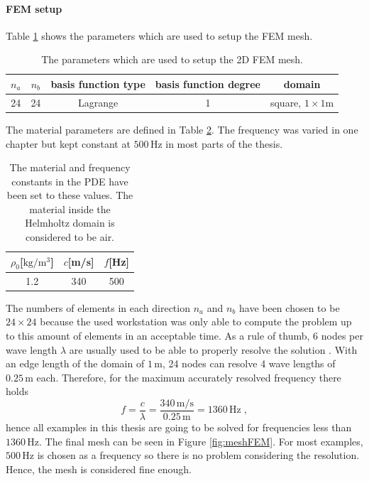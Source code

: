 \documentclass[%
  a4paper,oneside,%
  11pt,%
  smallchapters,
  style=printdev,
  extramargin,
  green,%
  rgb, <cmyk>
  ]{tubsbook}
\begin{document}
\paragraph{FEM setup}
Table \ref{tab:FEMSetup} shows the parameters which are used to setup the FEM mesh.  
\begin{table}[]
\centering
\caption{The parameters which are used to setup the 2D FEM mesh.}
\label{tab:FEMSetup}
\begin{tabular}{@{}ccccc@{}}
\toprule
$n_a$ & $n_b$ & basis function type & basis function degree & domain               \\ \midrule
24    & 24    & Lagrange            & 1                     & square, $1\times 1$m \\ \bottomrule
\end{tabular}
\end{table}
The material parameters are defined in Table \ref{tab:MatSetup}. The frequency was varied in one chapter but kept constant at $500\,\mathrm{Hz}$ in most parts of the thesis.
\begin{table}[]
\centering
\caption{The material and frequency constants in the PDE have been set to these values. The material inside the Helmholtz domain is considered to be air.}
\label{tab:MatSetup}
\begin{tabular}{@{}ccc@{}}
\toprule
$\rho_0${[}$\mathrm{kg/m^3}${]} & $c${[}m/s{]} & $f${[}Hz{]} \\ \midrule
1.2                   & 340          & 500         \\ \bottomrule
\end{tabular}
\end{table}
The numbers of elements in each direction $n_a$ and $n_b$ have been chosen to be $24\times 24$ because the used workstation was only able to compute the problem up to this amount of elements in an acceptable time. As a rule of thumb, 6 nodes per wave length $\lambda$ are usually used to be able to properly resolve the solution \cite{Marburga}. With an edge length of the domain of $1 \, \mathrm{m}$, 24 nodes can resolve 4 wave lengths of $0.25\, \mathrm{m}$ each. Therefore, for the maximum accurately resolved frequency there holds 
\begin{equation}
f = \frac{c}{\lambda} = \frac{340\,\mathrm{m/s}}{0.25 \, \mathrm{m}} = 1360 \, \mathrm{Hz} \;,
\end{equation}
hence all examples in this thesis are going to be solved for frequencies less than $1360\, \mathrm{Hz}$.
The final mesh can be seen in Figure \ref{fig:meshFEM}. For most examples, $500 \,\mathrm{Hz}$ is chosen as a frequency so there is no problem considering the resolution. Hence, the mesh is considered fine enough.
\end{document}
